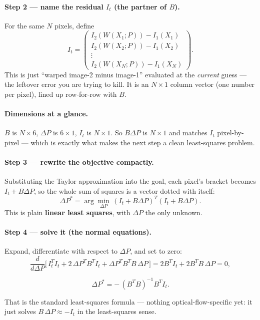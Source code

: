 \documentclass[11pt]{article}
\newcommand{\dP}{\Delta P}
\begin{document}
\paragraph{Step 2 --- name the residual $I_t$ (the partner of $B$).}
For the same $N$ pixels, define
\[
  I_t =
  \begin{pmatrix}
    I_2(W(X_1;P)) - I_1(X_1) \\
    I_2(W(X_2;P)) - I_1(X_2) \\
    \vdots \\
    I_2(W(X_N;P)) - I_1(X_N)
  \end{pmatrix}.
\]
This is just ``warped image-2 minus image-1'' evaluated at the \emph{current}
guess --- the leftover error you are trying to kill. It is an $N\times 1$ column
vector (one number per pixel), lined up row-for-row with $B$.

\paragraph{Dimensions at a glance.}
$B$ is $N\times 6$, \; $\dP$ is $6\times 1$, \; $I_t$ is $N\times 1$. So
$B\dP$ is $N\times 1$ and matches $I_t$ pixel-by-pixel --- which is exactly what
makes the next step a clean least-squares problem.

\paragraph{Step 3 --- rewrite the objective compactly.}
Substituting the Taylor approximation into the goal, each pixel's bracket becomes
$I_t + B\dP$, so the whole sum of squares is a vector dotted with itself:
\[
  \dP^* = \arg\min_{\dP}\,(I_t + B\dP)^T (I_t + B\dP).
\]
This is plain \textbf{linear least squares}, with $\dP$ the only unknown.

\paragraph{Step 4 --- solve it (the normal equations).}
Expand, differentiate with respect to $\dP$, and set to zero:
\[
  \frac{d}{d\dP}\Big[\,I_t^T I_t + 2\,\dP^T B^T I_t + \dP^T B^T B\,\dP\,\Big]
  = 2 B^T I_t + 2 B^T B\,\dP = 0 ,
\]
\begin{keybox}
\[
  \dP^* = -\,(B^T B)^{-1} B^T I_t .
\]
\end{keybox}
That is the standard least-squares formula --- nothing optical-flow-specific
yet: it just solves $B\,\dP \approx -I_t$ in the least-squares sense.
\end{document}
